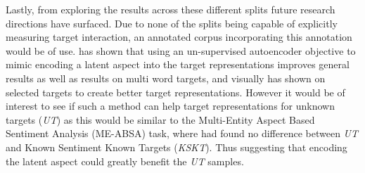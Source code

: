 Lastly, from exploring the results across these different splits future research directions have surfaced. Due to none of the splits being capable of explicitly measuring target interaction, an annotated corpus incorporating this annotation would be of use. \citet{he-etal-2018-effective} has shown that using an un-supervised autoencoder objective to mimic encoding a latent aspect into the target representations improves general results as well as results on multi word targets, and visually has shown on selected targets to create better target representations. However it would be of interest to see if such a method can help target representations for unknown targets (\textit{UT}) as this would be similar to the Multi-Entity Aspect Based Sentiment Analysis (ME-ABSA) task, where \citet{yang2018multi} had found no difference between \textit{UT} and Known Sentiment Known Targets (\textit{KSKT}). Thus suggesting that encoding the latent aspect could greatly benefit the \textit{UT} samples.

\FloatBarrier
